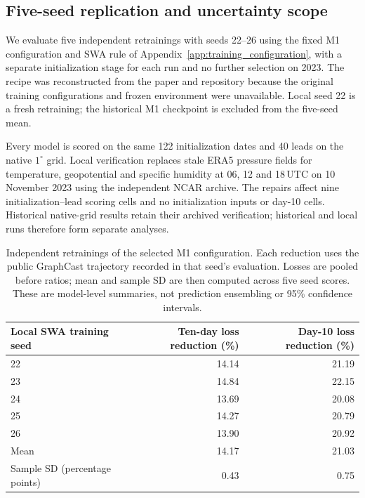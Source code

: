 \documentclass{article}
\newcommand{\vfourchange}[1]{{\color{blue}#1}}
\begin{document}
\subsection{\vfourchange{Five-seed replication and uncertainty scope}}
\label{app:seed_replication}

\vfourchange{We evaluate five independent retrainings with seeds 22--26 using the fixed M1 configuration and SWA rule of Appendix~\ref{app:training_configuration}, with a separate initialization stage for each run and no further selection on 2023. The recipe was reconstructed from the paper and repository because the original training configurations and frozen environment were unavailable. Local seed 22 is a fresh retraining; the historical M1 checkpoint is excluded from the five-seed mean.}

\vfourchange{Every model is scored on the same 122 initialization dates and 40 leads on the native $1^\circ$ grid. Local verification replaces stale ERA5 pressure fields for temperature, geopotential and specific humidity at 06, 12 and 18\,UTC on 10 November 2023 using the independent NCAR archive. The repairs affect nine initialization--lead scoring cells and no initialization inputs or day-10 cells. Historical native-grid results retain their archived verification; historical and local runs therefore form separate analyses.}

\begin{table}[!htbp]
    \centering
    \small
    \begingroup\color{blue}
    \begin{tabular}{lrr}
        \toprule
        Local SWA training seed & Ten-day loss reduction (\%) & Day-10 loss reduction (\%) \\
        \midrule
        22 & 14.14 & 21.19 \\
        23 & 14.84 & 22.15 \\
        24 & 13.69 & 20.08 \\
        25 & 14.27 & 20.79 \\
        26 & 13.90 & 20.92 \\
        \midrule
        Mean & 14.17 & 21.03 \\
        Sample SD (percentage points) & 0.43 & 0.75 \\
        \bottomrule
    \end{tabular}
    \endgroup
    \caption{\vfourchange{Independent retrainings of the selected M1 configuration. Each reduction uses the public GraphCast trajectory recorded in that seed's evaluation. Losses are pooled before ratios; mean and sample SD are then computed across five seed scores. These are model-level summaries, not prediction ensembling or 95\% confidence intervals.}}
    \label{tab:seed_replication}
\end{table}
\end{document}
